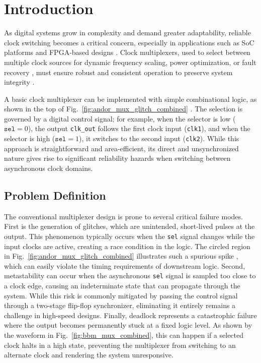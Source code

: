\documentclass[conference]{IEEEtran}
\begin{document}
\section{Introduction}

As digital systems grow in complexity and demand greater adaptability, reliable clock switching becomes a critical concern, especially in applications such as SoC platforms and FPGA-based designs \cite{Xanthopoulos2009}. Clock multiplexers, used to select between multiple clock sources for dynamic frequency scaling, power optimization, or fault recovery \cite{9470292}, must ensure robust and consistent operation to preserve system integrity \cite{vipin2018fpga}.

A basic clock multiplexer can be implemented with simple combinational logic, as shown in the top of Fig.~\ref{fig:andor_mux_glitch_combined} \cite{wakerly2006digital}. The selection is governed by a digital control signal; for example, when the selector is low ($\texttt{sel}=0$), the output \texttt{clk\_out} follows the first clock input (\texttt{clk1}), and when the selector is high ($\texttt{sel}=1$), it switches to the second input (\texttt{clk2}). While this approach is straightforward and area-efficient, its direct and unsynchronized nature gives rise to significant reliability hazards when switching between asynchronous clock domains.

\subsection{Problem Definition}

The conventional multiplexer design is prone to several critical failure modes. First is the generation of glitches, which are unintended, short-lived pulses at the output. This phenomenon typically occurs when the \texttt{sel} signal changes while the input clocks are active, creating a race condition in the logic. The circled region in Fig.~\ref{fig:andor_mux_glitch_combined} illustrates such a spurious spike \cite{1199169}, which can easily violate the timing requirements of downstream logic. Second, metastability can occur when the asynchronous \texttt{sel} signal is sampled too close to a clock edge, causing an indeterminate state that can propagate through the system. While this risk is commonly mitigated by passing the control signal through a two-stage flip-flop synchronizer, eliminating it entirely remains a challenge in high-speed designs. Finally, deadlock represents a catastrophic failure where the output becomes permanently stuck at a fixed logic level. As shown by the waveform in Fig.~\ref{fig:bbm_mux_combined}, this can happen if a selected clock halts in a high state, preventing the multiplexer from switching to an alternate clock and rendering the system unresponsive.
\end{document}
